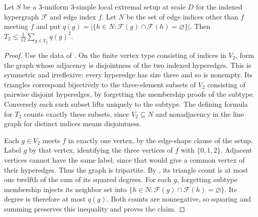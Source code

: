 \begin{lemma}
Let $S$ be a $3$-uniform $3$-simple local extremal setup at scale $D$
for the indexed hypergraph $\mathcal F$ and edge index $f$.
Let $N$ be the set of edge indices other than $f$ meeting $f$ and put
$q(g)=|\{h\in N:\mathcal F(g)\cap\mathcal F(h)=\varnothing\}|$.
Then $T_2\le\frac1{12}\sum_{g\in V_2}q(g)^2$.
\end{lemma}
\begin{proof}
Use the data of .
On the finite vertex type consisting of indices in $V_2$, form the graph
whose adjacency is disjointness of the two indexed hyperedges.
This is symmetric and irreflexive: every hyperedge has size three and
so is nonempty. Its triangles correspond bijectively to the three-element
subsets of $V_2$ consisting of pairwise disjoint hyperedges, by forgetting
the membership proofs of the subtype. Conversely each such subset lifts
uniquely to the subtype. The defining formula for $T_2$ counts exactly
these subsets, since $V_2\subseteq N$ and nonadjacency in the line graph
for distinct indices means disjointness.

Each $g\in V_2$ meets $f$ in exactly one vertex, by the edge-shape clause
of the setup. Label $g$ by that vertex, identifying the three vertices
of $f$ with $\{0,1,2\}$. Adjacent vertices cannot have the same label,
since that would give a common vertex of their hyperedges. Thus the graph
is tripartite. By , its triangle
count is at most one twelfth of the sum of its squared degrees.
For each $g$, forgetting subtype membership injects its neighbor set
into $\{h\in N:\mathcal F(g)\cap\mathcal F(h)=\varnothing\}$.
Its degree is therefore at most $q(g)$. Both counts are nonnegative,
so squaring and summing preserves this inequality and proves the claim.
\end{proof}
